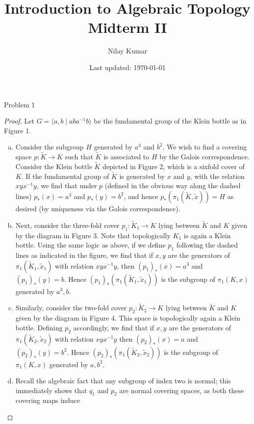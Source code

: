 \documentclass{../mathnotes}
\title{Introduction to Algebraic Topology Midterm II}
\author{Nilay Kumar}
\date{Last updated: \today}
\begin{document}
\maketitle

\begin{prop}
    Problem 1
\end{prop}
\begin{proof}
    Let $G=\langle a,b\mid aba^{-1}b\rangle$ be the fundamental group of the Klein bottle
    as in Figure 1.
    \begin{enumerate}[(a)]
        \item Consider the subgroup $H$ generated by $a^3$ and $b^2$. We wish to find a covering
            space $p:\tilde K\to K$ such that $\tilde K$ is associated to $H$ by the Galois correspondence.
            Consider the Klein bottle $\tilde K$ depicted in Figure 2, which is a sixfold cover of $K$.
            If the fundamental group of $\tilde K$ is generated by $x$ and $y$, with the relation
            $xyx^{-1}y$, we find that under $p$ (defined in the obvious way along the dashed lines)
            $p_*(x)=a^3$ and $p_*(y)=b^2$, and hence $p_*(\pi_1(\tilde K,\tilde x))=H$ as desired
            (by uniqueness via the Galois correspondence).
        \item Next, consider the three-fold cover $p_1:\tilde K_1\to K$ lying between $\tilde K$ and $K$
            given by the diagram in Figure 3. Note that topologically $K_1$ is again a Klein bottle.
            Using the same logic as above, if we define $p_1$ following the dashed lines as indicated in the
            figure, we find that if $x,y$ are the generators of $\pi_1(\tilde K_1,\tilde x_1)$ with relation
            $xyx^{-1}y$, then $(p_1)_*(x)=a^3$ and $(p_1)_*(y)=b$. Hence $(p_1)_*(\pi_1(\tilde K_1,\tilde x_1))$
            is the subgroup of $\pi_1(K,x)$ generated by $a^3,b$.
        \item Similarly, consider the two-fold cover $p_2:\tilde K_2\to K$ lying between $\tilde K$ and $K$
            given by the diagram in Figure 4. This space is topologically again a Klein bottle. Defining
            $p_2$ accordingly, we find that if $x,y$ are the generators of $\pi_1(\tilde K_2,\tilde x_2)$
            with relation $xyx^{-1}y$ then $(p_2)_*(x)=a$ and $(p_2)_*(y)=b^2$. Hence $(p_2)_*(\pi_1(\tilde K_2,\tilde x_2))$
            is the subgroup of $\pi_1(K,x)$ generated by $a,b^2$.
        \item Recall the algebraic fact that any subgroup of index two is normal; this immediately
            shows that $q_1$ and $p_2$ are normal covering spaces, as both these covering maps induce

\end{enumerate}
\end{proof}
\end{document}
